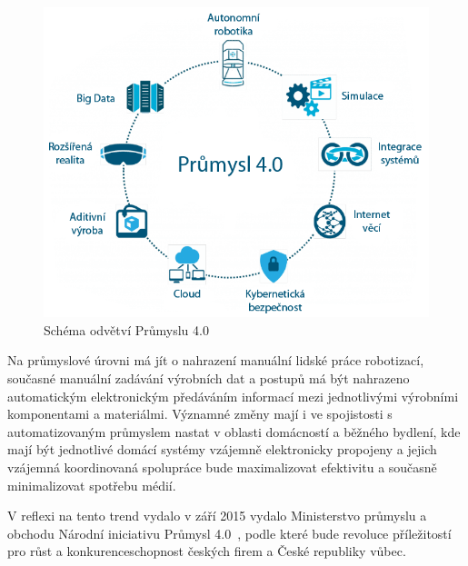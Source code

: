 	\begin{figure}[!ht]
  \begin{center}
   \includegraphics[scale=0.4]{obrazky/iot_industry4}
  \end{center}
  \caption{Schéma odvětví Průmyslu 4.0}
\end{figure}


Na průmyslové úrovni má jít o nahrazení manuální lidské práce robotizací, současné manuální zadávání výrobních dat a postupů má být nahrazeno automatickým elektronickým předáváním informací mezi jednotlivými výrobními komponentami a materiálmi. Významné změny mají i ve spojistosti s automatizovaným průmyslem nastat v oblasti domácností a běžného bydlení, kde mají být jednotlivé domácí systémy vzájemně elektronicky propojeny a jejich vzájemná koordinovaná spolupráce bude maximalizovat efektivitu a současně minimalizovat spotřebu médií.

V reflexi na tento trend vydalo v září 2015 vydalo Ministerstvo průmyslu a obchodu Národní iniciativu Průmysl 4.0~\cite{uvod_prumysl_4_pdf}, podle které bude revoluce příležitostí pro růst a konkurenceschopnost českých firem a České republiky vůbec.








